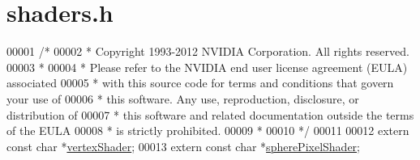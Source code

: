 \hypertarget{shaders_8h_source}{\section{shaders.\-h}
}

\begin{DoxyCode}
00001 \textcolor{comment}{/*}
00002 \textcolor{comment}{ * Copyright 1993-2012 NVIDIA Corporation.  All rights reserved.}
00003 \textcolor{comment}{ *}
00004 \textcolor{comment}{ * Please refer to the NVIDIA end user license agreement (EULA) associated}
00005 \textcolor{comment}{ * with this source code for terms and conditions that govern your use of}
00006 \textcolor{comment}{ * this software. Any use, reproduction, disclosure, or distribution of}
00007 \textcolor{comment}{ * this software and related documentation outside the terms of the EULA}
00008 \textcolor{comment}{ * is strictly prohibited.}
00009 \textcolor{comment}{ *}
00010 \textcolor{comment}{ */}
00011 
00012 \textcolor{keyword}{extern} \textcolor{keyword}{const} \textcolor{keywordtype}{char} *\hyperlink{shaders_8cpp_aea8e0959f6b7eabf6156f801e179da60}{vertexShader};
00013 \textcolor{keyword}{extern} \textcolor{keyword}{const} \textcolor{keywordtype}{char} *\hyperlink{shaders_8cpp_abad1d2b70401d6f3a4f61a462369373d}{spherePixelShader};
\end{DoxyCode}
